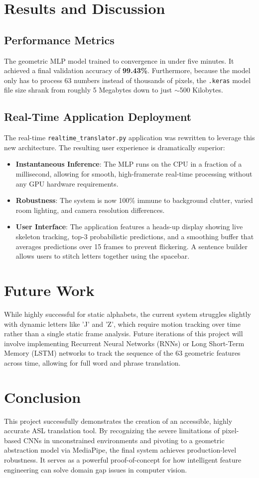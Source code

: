 \documentclass[12pt,a4paper]{article}
\begin{document}
\section{Results and Discussion}

\subsection{Performance Metrics}
The geometric MLP model trained to convergence in under five minutes. It achieved a final validation accuracy of \textbf{99.43\%}. Furthermore, because the model only has to process 63 numbers instead of thousands of pixels, the \texttt{.keras} model file size shrank from roughly 5 Megabytes down to just $\sim$500 Kilobytes.

\subsection{Real-Time Application Deployment}
The real-time \texttt{realtime\_translator.py} application was rewritten to leverage this new architecture. The resulting user experience is dramatically superior:
\begin{itemize}
    \item \textbf{Instantaneous Inference}: The MLP runs on the CPU in a fraction of a millisecond, allowing for smooth, high-framerate real-time processing without any GPU hardware requirements.
    \item \textbf{Robustness}: The system is now 100\% immune to background clutter, varied room lighting, and camera resolution differences.
    \item \textbf{User Interface}: The application features a heads-up display showing live skeleton tracking, top-3 probabilistic predictions, and a smoothing buffer that averages predictions over 15 frames to prevent flickering. A sentence builder allows users to stitch letters together using the spacebar.
\end{itemize}

\section{Future Work}
While highly successful for static alphabets, the current system struggles slightly with dynamic letters like 'J' and 'Z', which require motion tracking over time rather than a single static frame analysis. Future iterations of this project will involve implementing Recurrent Neural Networks (RNNs) or Long Short-Term Memory (LSTM) networks to track the sequence of the 63 geometric features across time, allowing for full word and phrase translation.

\section{Conclusion}
This project successfully demonstrates the creation of an accessible, highly accurate ASL translation tool. By recognizing the severe limitations of pixel-based CNNs in unconstrained environments and pivoting to a geometric abstraction model via MediaPipe, the final system achieves production-level robustness. It serves as a powerful proof-of-concept for how intelligent feature engineering can solve domain gap issues in computer vision.
\end{document}
